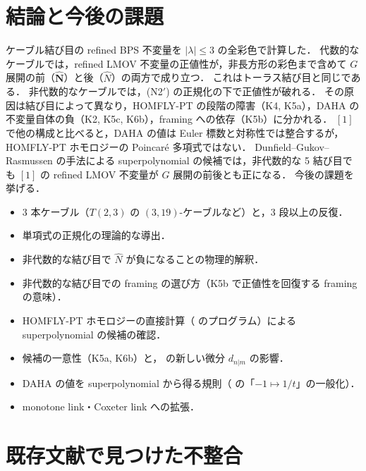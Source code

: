 \documentclass[11pt,a4paper]{ltjsarticle}
\theoremstyle{definition}
\theoremstyle{remark}
\newcommand{\hN}{\widehat{N}}
\newcommand{\hbN}{\widehat{\mathbf{N}}}
\begin{document}
\section{結論と今後の課題}

ケーブル結び目の refined BPS 不変量を $|\lambda|\le3$ の全彩色で計算した．
代数的なケーブルでは，refined LMOV 不変量の正値性が，非長方形の彩色まで含めて $G$ 展開の前（$\hbN$）と後（$\hN$）の両方で成り立つ．
これはトーラス結び目と同じである．
非代数的なケーブルでは，(N2$'$) の正規化の下で正値性が破れる．
その原因は結び目によって異なり，HOMFLY-PT の段階の障害（K4, K5a），DAHA の不変量自体の負（K2, K5c, K6b），framing への依存（K5b）に分かれる．
$[1]$ で他の構成と比べると，DAHA の値は Euler 標数と対称性では整合するが，HOMFLY-PT ホモロジーの Poincaré 多項式ではない．
Dunfield--Gukov--Rasmussen の手法による superpolynomial の候補では，非代数的な 5 結び目でも $[1]$ の refined LMOV 不変量が $G$ 展開の前後とも正になる．
今後の課題を挙げる．
\begin{itemize}
\item 3 本ケーブル（$T(2,3)$ の $(3,19)$-ケーブルなど）と，3 段以上の反復．
\item 単項式の正規化の理論的な導出．
\item 非代数的な結び目で $\hN$ が負になることの物理的解釈．
\item 非代数的な結び目での framing の選び方（K5b で正値性を回復する framing の意味）．
\item HOMFLY-PT ホモロジーの直接計算（\cite{NS} のプログラム）による superpolynomial の候補の確認．
\item 候補の一意性（K5a, K6b）と，\cite{GGS} の新しい微分 $d_{n|m}$ の影響．
\item DAHA の値を superpolynomial から得る規則（\cite{CD14} の「$-1\mapsto1/t$」の一般化）．
\item monotone link・Coxeter link \cite{GL} への拡張．
\end{itemize}

\appendix
\section{既存文献で見つけた不整合}\label{app:issues}
\end{document}
